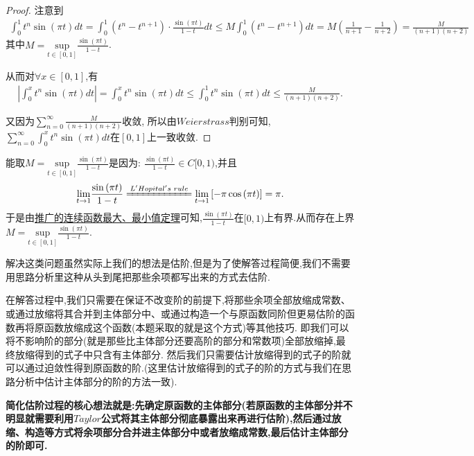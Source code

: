 \documentclass[lang=cn,newtx,10pt,scheme=chinese]{../Template/elegantbook}
\begin{document}
\begin{proof}
{\color{blue}}
注意到\begin{align*}
\int_0^1{t^n\sin \left( \pi t \right) dt}=\int_0^1{ \left( t^n-t^{n+1} \right) \cdot \frac{\sin \left( \pi t \right)}{1-t}  dt}\leqslant M\int_0^1{\left( t^n-t^{n+1} \right)}dt=M\left( \frac{1}{n+1}-\frac{1}{n+2} \right) =\frac{M}{\left( n+1 \right) \left( n+2 \right)}
\end{align*}
其中$M=\underset{t\in \left[ 0,1 \right]}{\mathrm{sup}}\frac{\sin \left( \pi t \right)}{1-t}$.

从而对$\forall x\in[0,1]$,有\begin{align*}
\left| \int_0^x{t^n\sin \left( \pi t \right) dt} \right|=\int_0^x{t^n\sin \left( \pi t \right) dt}\leqslant \int_0^1{t^n\sin \left( \pi t \right) dt}\leqslant \frac{M}{\left( n+1 \right) \left( n+2 \right)}.
\end{align*}



又因为$\sum_{n=0}^{\infty}{\frac{M}{\left( n+1 \right) \left( n+2 \right)}}$收敛,
所以由$Weierstrass$判别可知,$\sum_{n=0}^{\infty}{\int_0^x{t^n\sin \left( \pi t \right) dt}}$在$\left[ 0,1 \right] $上一致收敛.
\end{proof}
\begin{remark}
能取$M=\underset{t\in \left[ 0,1 \right]}{\mathrm{sup}}\frac{\sin \left( \pi t \right)}{1-t}$是因为:
$\frac{\sin \left( \pi t \right)}{1-t}\in C[0,1)$,并且
\begin{align*}
\underset{t\rightarrow 1}{\lim}\frac{\sin \left( \pi t \right)}{1-t}\xlongequal{L'Hopital's\,\,rule}\underset{t\rightarrow 1}{\lim}\left[ -\pi \cos \left( \pi t \right) \right] =\pi .
\end{align*}
于是由\hyperlink{label}{推广的连续函数最大、最小值定理}可知,$\frac{\sin \left( \pi t \right)}{1-t}$在$[0,1)$上有界.从而存在上界$M=\underset{t\in \left[ 0,1 \right]}{\mathrm{sup}}\frac{\sin \left( \pi t \right)}{1-t}$.
\end{remark}
\begin{remark}
解决这类问题虽然实际上我们的想法是估阶,但是为了使解答过程简便,我们不需要用思路分析里这种从头到尾把那些余项都写出来的方式去估阶.

在解答过程中,我们只需要在保证不改变阶的前提下,将那些余项全部放缩成常数、或通过放缩将其合并到主体部分中、或通过构造一个与原函数同阶但更易估阶的函数再将原函数放缩成这个函数(本题采取的就是这个方式)等其他技巧.
即我们可以将不影响阶的部分(就是那些比主体部分还要高阶的部分和常数项)全部放缩掉,最终放缩得到的式子中只含有主体部分.
然后我们只需要估计放缩得到的式子的阶就可以通过迫敛性得到原函数的阶.(这里估计放缩得到的式子的阶的方式与我们在思路分析中估计主体部分的阶的方法一致).
\end{remark}
\begin{conclusion}\label{简化估阶过程的核心想法}
\textbf{简化估阶过程的核心想法就是:先确定原函数的主体部分(若原函数的主体部分并不明显就需要利用$Taylor$公式将其主体部分彻底暴露出来再进行估阶),然后通过放缩、构造等方式将余项部分合并进主体部分中或者放缩成常数,最后估计主体部分的阶即可.}
\end{conclusion}
\end{document}
